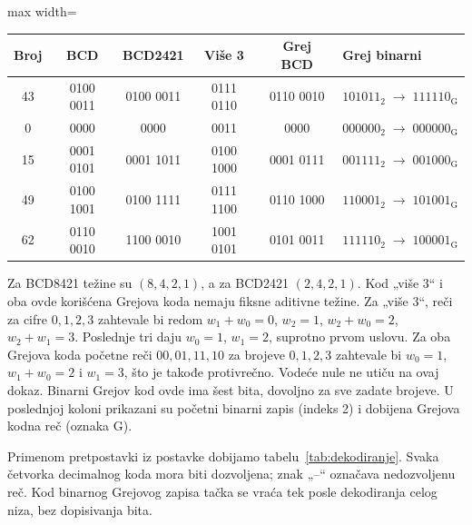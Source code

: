 \documentclass[a4paper,11pt]{article}
\numberwithin{equation}{section}
\newcommand{\redlinija}{\arrayrulecolor{black!28}\specialrule{0.3pt}{2pt}{2pt}\arrayrulecolor{black}}
\begin{document}
\begin{center}\begin{minipage}{\linewidth}\centering\captionsetup{hypcap=false}
\label{tab:kodiranje}

\begin{adjustbox}{max width=\linewidth}\begin{tabular}{ccccc>{\centering\arraybackslash}p{4.3cm}}\toprule
Broj & BCD & BCD2421 & Više 3 & Grej BCD & Grej binarni\\\midrule
43 & 0100 0011 & 0100 0011 & 0111 0110 & 0110 0010 & $101011_2\;\to\;111110_{\mathrm{G}}$\\
\redlinija
0 & 0000 & 0000 & 0011 & 0000 & $000000_2\;\to\;000000_{\mathrm{G}}$\\
\redlinija
15 & 0001 0101 & 0001 1011 & 0100 1000 & 0001 0111 & $001111_2\;\to\;001000_{\mathrm{G}}$\\
\redlinija
49 & 0100 1001 & 0100 1111 & 0111 1100 & 0110 1000 & $110001_2\;\to\;101001_{\mathrm{G}}$\\
\redlinija
62 & 0110 0010 & 1100 0010 & 1001 0101 & 0101 0011 & $111110_2\;\to\;100001_{\mathrm{G}}$\\
\bottomrule\end{tabular}\end{adjustbox}
\end{minipage}\end{center}

Za BCD8421 težine su $(8,4,2,1)$, a za BCD2421 $(2,4,2,1)$. Kod „više 3“ i oba ovde korišćena Grejova koda nemaju fiksne aditivne težine. Za „više 3“, reči za cifre $0,1,2,3$ zahtevale bi redom $w_1+w_0=0$, $w_2=1$, $w_2+w_0=2$, $w_2+w_1=3$. Poslednje tri daju $w_0=1$, $w_1=2$, suprotno prvom uslovu. Za oba Grejova koda početne reči $00,01,11,10$ za brojeve $0,1,2,3$ zahtevale bi $w_0=1$, $w_1+w_0=2$ i $w_1=3$, što je takođe protivrečno. Vodeće nule ne utiču na ovaj dokaz. Binarni Grejov kod ovde ima šest bita, dovoljno za sve zadate brojeve. U poslednjoj koloni prikazani su početni binarni zapis (indeks 2) i dobijena Grejova kodna reč (oznaka G).\par

Primenom pretpostavki iz postavke dobijamo tabelu~\ref{tab:dekodiranje}. Svaka četvorka decimalnog koda mora biti dozvoljena; znak „--“ označava nedozvoljenu reč. Kod binarnog Grejovog zapisa tačka se vraća tek posle dekodiranja celog niza, bez dopisivanja bita.
\end{document}
